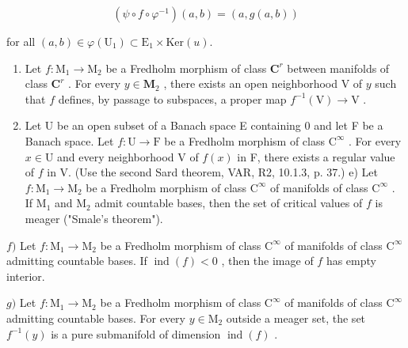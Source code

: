 \[
(\psi \circ f \circ \varphi^ {- 1}) (a, b) = (a, g (a, b))
\]

for all \((a,b)\in \varphi (\mathrm{U}_1)\subset \mathrm{E}_1\times \mathrm{Ker}(u).\)

\begin{enumerate}
\def\labelenumi{\alph{enumi})}
\setcounter{enumi}{2}
\item
  Let \(f \colon \mathrm{M}_1 \to \mathrm{M}_2\) be a Fredholm morphism of class \(\mathbf{C}^r\) between manifolds of class \(\mathbf{C}^r\) . For every \(y \in \mathbf{M}_2\) , there exists an open neighborhood \(\mathrm{V}\) of \(y\) such that \(f\) defines, by passage to subspaces, a proper map \(f^{-1}(\mathrm{V}) \to \mathrm{V}\) .
\item
  Let U be an open subset of a Banach space E containing 0 and let F be a Banach space. Let \(f \colon \mathrm{U} \to \mathrm{F}\) be a Fredholm morphism of class \(\mathrm{C}^{\infty}\) . For every \(x \in \mathrm{U}\) and every neighborhood V of \(f(x)\) in F, there exists a regular value of \(f\) in V. (Use the second Sard theorem, VAR, R2, 10.1.3, p. 37.) e) Let \(f \colon \mathrm{M}_1 \to \mathrm{M}_2\) be a Fredholm morphism of class \(\mathrm{C}^{\infty}\) of manifolds of class \(\mathrm{C}^{\infty}\) . If \(\mathrm{M}_1\) and \(\mathrm{M}_2\) admit countable bases, then the set of critical values of \(f\) is meager ("Smale's theorem").
\end{enumerate}

\(f)\) Let \(f\colon \mathrm{M}_1\to \mathrm{M}_2\) be a Fredholm morphism of class \(\mathrm{C}^{\infty}\) of manifolds of class \(\mathrm{C}^{\infty}\) admitting countable bases. If \(\operatorname {ind}(f) < 0\) , then the image of \(f\) has empty interior.

\(g)\) Let \(f\colon \mathrm{M}_1\to \mathrm{M}_2\) be a Fredholm morphism of class \(\mathrm{C}^{\infty}\) of manifolds of class \(\mathrm{C}^{\infty}\) admitting countable bases. For every \(y\in \mathrm{M}_2\) outside a meager set, the set \(f^{-1}(y)\) is a pure submanifold of dimension \(\operatorname {ind}(f)\) .